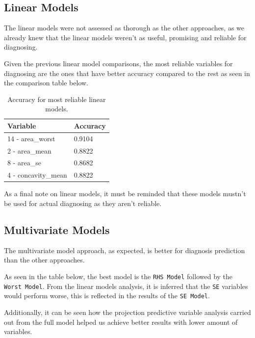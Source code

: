 \documentclass[
]{article}
\begin{document}
\hypertarget{linear-models-3}{%
\subsection{Linear Models}\label{linear-models-3}}

The linear models were not assessed as thorough as the other approaches,
as we already knew that the linear models weren't as useful, promising
and reliable for diagnosing.

Given the previous linear model comparisons, the most reliable variables
for diagnosing are the ones that have better accuracy compared to the
rest as seen in the comparison table below.

\begin{table}[H]
\centering
\begin{tabular}{|l|l|}
\hline
\textbf{Variable}   & \textbf{Accuracy} \\ \hline
14 - area\_worst    & 0.9104            \\ \hline
2 - area\_mean      & 0.8822            \\ \hline
8 - area\_se        & 0.8682            \\ \hline
4 - concavity\_mean & 0.8822            \\ \hline
\end{tabular}
\caption{Accuracy for most reliable linear models.}
\end{table}

As a final note on linear models, it must be reminded that these models
mustn't be used for actual diagnosing as they aren't reliable.

\hypertarget{multivariate-models-2}{%
\subsection{Multivariate Models}\label{multivariate-models-2}}

The multivariate model approach, as expected, is better for diagnosis
prediction than the other approaches.

As seen in the table below, the best model is the \texttt{RHS\ Model}
followed by the \texttt{Worst\ Model}. From the linear models analysis,
it is inferred that the \texttt{SE} variables would perform worse, this
is reflected in the results of the \texttt{SE\ Model}.

Additionally, it can be seen how the projection predictive variable
analysis carried out from the full model helped us achieve better
results with lower amount of variables.
\end{document}
